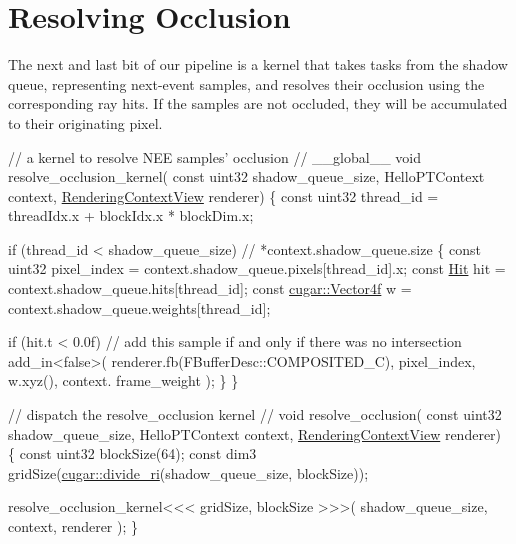 \hypertarget{_hello_renderer_page_HelloPTSolvingOcclusionSection}{}\section{Resolving Occlusion}\label{_hello_renderer_page_HelloPTSolvingOcclusionSection}
\begin{DoxyParagraph}{}
The next and last bit of our pipeline is a kernel that takes tasks from the shadow queue, representing next-\/event samples, and resolves their occlusion using the corresponding ray hits. If the samples are not occluded, they will be accumulated to their originating pixel. \label{_hello_renderer_page_resolve_occlusion_anchor}%
%
 ~\newline
 
\begin{DoxyCodeInclude}
\textcolor{comment}{// a kernel to resolve NEE samples' occlusion}
\textcolor{comment}{//}
\_\_global\_\_
\textcolor{keywordtype}{void} resolve\_occlusion\_kernel(
    \textcolor{keyword}{const} uint32            shadow\_queue\_size,
    HelloPTContext          context,
    \hyperlink{struct_rendering_context_view}{RenderingContextView}    renderer)
\{
    \textcolor{keyword}{const} uint32 thread\_id = threadIdx.x + blockIdx.x * blockDim.x;

    \textcolor{keywordflow}{if} (thread\_id < shadow\_queue\_size) \textcolor{comment}{// *context.shadow\_queue.size}
    \{
        \textcolor{keyword}{const} uint32          pixel\_index   = context.shadow\_queue.pixels[thread\_id].x;
        \textcolor{keyword}{const} \hyperlink{struct_hit}{Hit}              hit           = context.shadow\_queue.hits[thread\_id];
        \textcolor{keyword}{const} \hyperlink{structcugar_1_1_vector}{cugar::Vector4f} w              = context.shadow\_queue.weights[thread\_id];

        \textcolor{keywordflow}{if} (hit.t < 0.0f) \textcolor{comment}{// add this sample if and only if there was no intersection}
            add\_in<false>( renderer.fb(FBufferDesc::COMPOSITED\_C), pixel\_index, w.xyz(), context.
      frame\_weight );
    \}
\}

\textcolor{comment}{// dispatch the resolve\_occlusion kernel}
\textcolor{comment}{//}
\textcolor{keywordtype}{void} resolve\_occlusion(
    \textcolor{keyword}{const} uint32            shadow\_queue\_size,
    HelloPTContext          context,
    \hyperlink{struct_rendering_context_view}{RenderingContextView}    renderer)
\{
    \textcolor{keyword}{const} uint32 blockSize(64);
    \textcolor{keyword}{const} dim3 gridSize(\hyperlink{group___basic_utils_gabb6714186dbbd864f0a9298944ba509b}{cugar::divide\_ri}(shadow\_queue\_size, blockSize));

    resolve\_occlusion\_kernel<<< gridSize, blockSize >>>( shadow\_queue\_size, context, renderer );
\}
\end{DoxyCodeInclude}
 
\end{DoxyParagraph}
